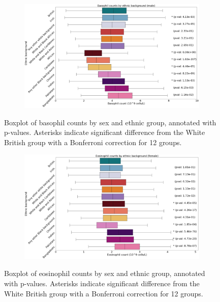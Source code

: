 \documentclass[12pt]{pnas-new}
\begin{document}
\begin{figure}
    \centering
    \begin{subfigure}{\textwidth}
    \includegraphics[width=\textwidth]{images/male_basophill_boxplot_annotated.pdf}
    \end{subfigure}
    \caption{Boxplot of basophil counts by sex and ethnic group, annotated with p-values. Asterisks indicate significant difference from the White British group with a Bonferroni correction for 12 groups.}
    \label{fig:supp_box_basophill_m}
\end{figure}

\begin{figure}
    \centering
    \begin{subfigure}{\textwidth}
    \includegraphics[width=\textwidth]{images/female_eosinophill_boxplot_annotated.pdf}
    \end{subfigure}
    \caption{Boxplot of eosinophil counts by sex and ethnic group, annotated with p-values. Asterisks indicate significant difference from the White British group with a Bonferroni correction for 12 groups.}
    \label{fig:supp_box_eosinophill_f}
\end{figure}
\end{document}
